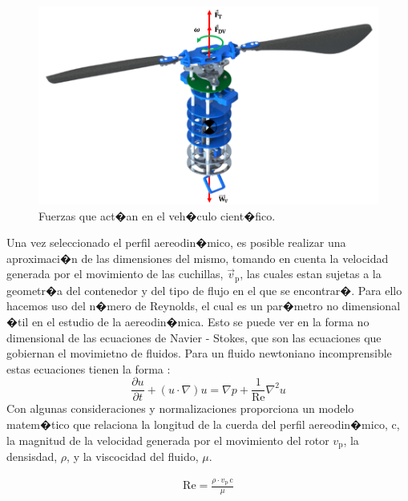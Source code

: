 \documentclass[10pt,a4paper]{book}
\begin{document}
\begin{figure}[H]
\begin{center}
\includegraphics[scale=0.50]{Imagenes/Vehiculo.png}  
\caption{Fuerzas que act�an en el veh�culo cient�fico. \label{Vehiculo}}
\end{center}
\end{figure}

Una vez seleccionado el perfil aereodin�mico, es posible realizar una aproximaci�n  de las dimensiones del mismo, tomando en cuenta la velocidad generada por el movimiento de las cuchillas, $\overrightarrow{v}_{\text{p}}$, las cuales estan sujetas a la geometr�a del contenedor y del tipo de flujo en el que se encontrar�. Para ello hacemos uso del n�mero de Reynolds, el cual es un par�metro no dimensional �til en el estudio de la aereodin�mica. Esto se puede ver en la forma no dimensional de las ecuaciones de Navier - Stokes, que son las ecuaciones que gobiernan el movimietno de fluidos. Para un fluido newtoniano incomprensible estas ecuaciones tienen la forma \cite{Reynolds}: 
\begin{equation}
\frac{ \partial u }{\partial t}+(u \cdot \nabla)u = \nabla p + \frac{1}{\text{Re}} \nabla^{2}u
\end{equation}
Con algunas consideraciones y normalizaciones \cite{Reynolds} proporciona un modelo matem�tico que relaciona la longitud de la cuerda del perfil aereodin�mico, $\text{c}$, la magnitud de la velocidad generada por el movimiento del rotor $v_{\text{p}}$, la densisdad, $\rho$, y la viscocidad del fluido, $\mu$. 

\begin{eqnarray}
\text{Re} = \frac{ \rho \cdot v_{\text{p} \cdot }  \text{c}}{ \mu }
\end{eqnarray}
\end{document}
